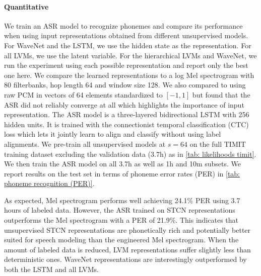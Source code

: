 {\paragraph{Quantitative}
We train an ASR model to recognize phonemes and compare its performance when using input representations obtained from different unsupervised models. 
For WaveNet and the LSTM, we use the hidden state as the representation. For all LVMs, we use the latent variable. For the hierarchical LVMs and WaveNet, we run the experiment using each possible representation and report only the best one here. 
We compare the learned representations to a log Mel spectrogram with 80 filterbanks, hop length 64 and window size 128. 
We also compared to using raw PCM in vectors of 64 elements standardized to $[-1,1]$ but found that the ASR did not reliably converge at all which highlights the importance of input representation. 
The ASR model is a three-layered bidirectional LSTM with 256 hidden units. It is trained with the connectionist temporal classification (CTC) loss \cite{graves_connectionist_2006} which lets it jointly learn to align and classify without using label alignments. 
We pre-train all unsupervised models at $s=64$ on the full TIMIT training dataset excluding the validation data (3.7h) as in \cref{tab: likelihoods timit}. 
We then train the ASR model on all 3.7h as well as 1h and 10m subsets. We report results on the test set in terms of phoneme error rates (PER) in \cref{tab: phoneme recognition (PER)}. 

As expected, Mel spectrogram performs well achieving 24.1\% PER using 3.7 hours of labeled data. However, the ASR trained on STCN representations outperforms the Mel spectrogram with a PER of 21.9\%. 
This indicates that unsupervised STCN representations are phonetically rich and potentially better suited for speech modeling than the engineered Mel spectrogram. 
When the amount of labeled data is reduced, LVM representations suffer slightly less than deterministic ones. WaveNet representations are interestingly outperformed by both the LSTM and all LVMs. 


}
